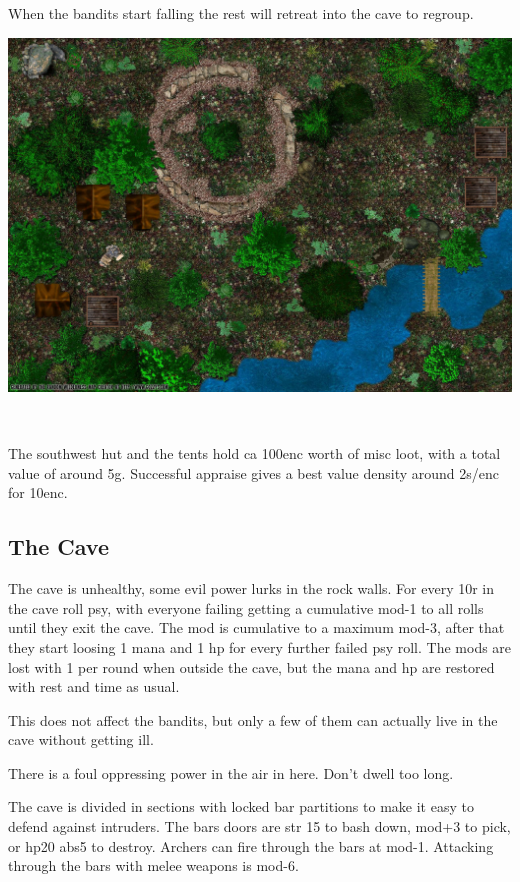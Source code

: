 When the bandits start falling the rest will retreat into the cave to regroup.

\begin{center}
\includegraphics[width=1.0\linewidth]{./maps/Eisenkrafs-Bandits-Camp-(32+0+0).jpg}
\end{center}

\


The southwest hut and the tents hold ca 100enc worth of misc loot, with a total value of around 5g. Successful appraise gives a best value density around 2s/enc for 10enc.


\subsection*{The Cave}
The cave is unhealthy, some evil power lurks in the rock walls. For every 10r in the cave roll psy, with everyone failing getting a cumulative mod-1 to all rolls until they exit the cave. The mod is cumulative to a maximum mod-3, after that they start loosing 1 mana and 1 hp for every further failed psy roll. The mods are lost with 1 per round when outside the cave, but the mana and hp are restored with rest and time as usual.

This does not affect the bandits, but only a few of them can actually live in the cave without getting ill.

\begin{readoutloud}
There is a foul oppressing power in the air in here. Don't dwell too long.
\end{readoutloud}

The cave is divided in sections with locked bar partitions to make it easy to defend against intruders. The bars doors are str 15 to bash down, mod+3 to pick, or hp20 abs5 to destroy. Archers can fire through the bars at mod-1. Attacking through the bars with melee weapons is mod-6.

